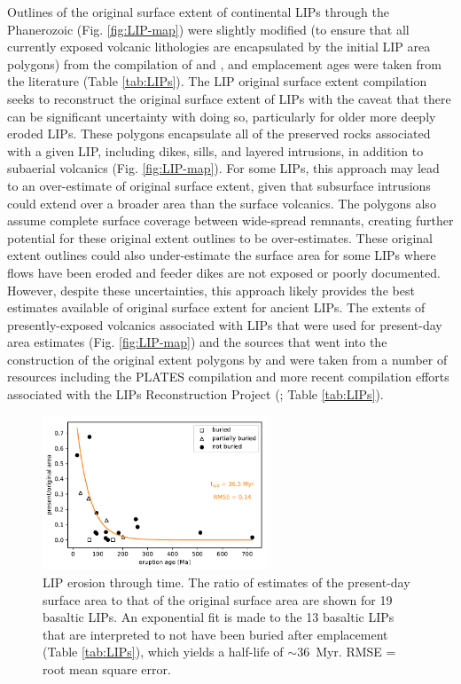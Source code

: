 Outlines of the original surface extent of continental LIPs through the Phanerozoic (Fig. \ref{fig:LIP-map}) were slightly modified (to ensure that all currently exposed volcanic lithologies are encapsulated by the initial LIP area polygons) from the compilation of \citet{Ernst2017a} and \citet{Ernst2019a}, and emplacement ages were taken from the literature (Table \ref{tab:LIPs}). The LIP original surface extent compilation seeks to reconstruct the original surface extent of LIPs with the caveat that there can be significant uncertainty with doing so, particularly for older more deeply eroded LIPs. These polygons encapsulate all of the preserved rocks associated with a given LIP, including dikes, sills, and layered intrusions, in addition to subaerial volcanics (Fig. \ref{fig:LIP-map}). For some LIPs, this approach may lead to an over-estimate of original surface extent, given that subsurface intrusions could extend over a broader area than the surface volcanics. The polygons also assume complete surface coverage between wide-spread remnants, creating further potential for these original extent outlines to be over-estimates. These original extent outlines could also under-estimate the surface area for some LIPs where flows have been eroded and feeder dikes are not exposed or poorly documented. However, despite these uncertainties, this approach likely provides the best estimates available of original surface extent for ancient LIPs. The extents of presently-exposed volcanics associated with LIPs that were used for present-day area estimates (Fig. \ref{fig:LIP-map}) and the sources that went into the construction of the original extent polygons by \citet{Ernst2017a} and \citet{Ernst2019a} were taken from a number of resources including the PLATES compilation \citep{Coffin2006a} and more recent compilation efforts associated with the LIPs Reconstruction Project (\citealp{Ernst2013a}; Table \ref{tab:LIPs}).

\begin{figure}[h!]
\begin{center}
	\includegraphics[width=0.6\textwidth]{figures/LIPs/LIP-preservation.pdf}
	\caption[Large igneous province erosion through time.]{LIP erosion through time. The ratio of estimates of the present-day surface area to that of the original surface area are shown for 19 basaltic LIPs. An exponential fit is made to the 13 basaltic LIPs that are interpreted to not have been buried after emplacement (Table \ref{tab:LIPs}), which yields a half-life of $\sim$36~Myr. RMSE = root mean square error.}
	\label{fig:LIP-preservation}
\end{center}
\end{figure}

